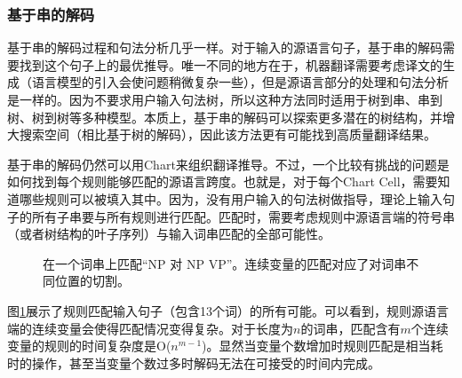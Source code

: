 
\subsubsection{基于串的解码}

\parinterval 基于串的解码过程和句法分析几乎一样。对于输入的源语言句子，基于串的解码需要找到这个句子上的最优推导。唯一不同的地方在于，机器翻译需要考虑译文的生成（语言模型的引入会使问题稍微复杂一些），但是源语言部分的处理和句法分析是一样的。因为不要求用户输入句法树，所以这种方法同时适用于树到串、串到树、树到树等多种模型。本质上，基于串的解码可以探索更多潜在的树结构，并增大搜索空间（相比基于树的解码），因此该方法更有可能找到高质量翻译结果。

\parinterval 基于串的解码仍然可以用Chart来组织翻译推导。不过，一个比较有挑战的问题是如何找到每个规则能够匹配的源语言跨度。也就是，对于每个Chart Cell，需要知道哪些规则可以被填入其中。因为，没有用户输入的句法树做指导，理论上输入句子的所有子串要与所有规则进行匹配。匹配时，需要考虑规则中源语言端的符号串（或者树结构的叶子序列）与输入词串匹配的全部可能性。

\begin{figure}[htp]
\centering

\caption{在一个词串上匹配``NP 对 NP VP''。连续变量的匹配对应了对词串不同位置的切割。}
\label{fig:4-70}
\end{figure}

\parinterval 图\ref{fig:4-70}展示了规则匹配输入句子（包含13个词）的所有可能。可以看到，规则源语言端的连续变量会使得匹配情况变得复杂。对于长度为$n$的词串，匹配含有$m$个连续变量的规则的时间复杂度是O($n^{m-1}$)。显然当变量个数增加时规则匹配是相当耗时的操作，甚至当变量个数过多时解码无法在可接受的时间内完成。

